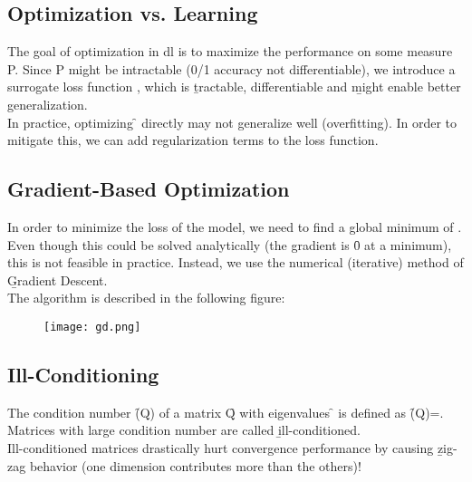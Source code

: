 \subsection{Optimization vs. Learning}

The goal of optimization in \ac{dl} is to maximize the performance on some measure P. Since P might be intractable (0/1 accuracy not differentiable), we introduce a surrogate loss function \pL, which is \b{tractable, differentiable} and \b{might enable better generalization}.\\
In practice, optimizing \f{} directly may not generalize well (overfitting). In order to mitigate this, we can add regularization terms to the loss function.


\subsection{Gradient-Based Optimization}
In order to minimize the loss of the model, we need to find a global minimum of \pL. Even though this could be solved analytically (the gradient is \f{0} at a minimum), this is not feasible in practice. Instead, we use the numerical (iterative) method of \b{Gradient Descent}.\\
The algorithm is described in the following figure:
\vspace{0.3cm}
\begin{figure}[h]
    \centering
    \texttt{[image: gd.png]}
\end{figure}

\subsection{Ill-Conditioning}
The condition number \f{\kappa(Q)} of a matrix \f{Q} with eigenvalues \f{\lambda} is defined as \f{\kappa(Q)=\frac{\lambda_{\max}}{\lambda_{\min}}}.\\
Matrices with large condition number are called \b{ill-conditioned}.\\
Ill-conditioned matrices drastically hurt convergence performance by causing \b{zig-zag behavior} (one dimension contributes more than the others)!\\[0.5em]

